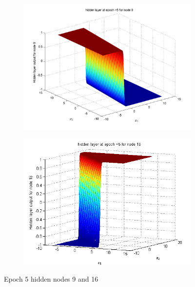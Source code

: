 \documentclass{article}
\begin{document}
\begin{figure}
\begin{subfigure}{.5\textwidth}
  \centering
  \includegraphics[width=.8\linewidth]{Classification/overlapping/h5_9}
 
\end{subfigure}%
\begin{subfigure}{.5\textwidth}
  \centering
  \includegraphics[width=.8\linewidth]{Classification/overlapping/h5_16}
  \end{subfigure}
\caption{Epoch 5 hidden nodes 9 and 16}
\end{figure}
\end{document}
